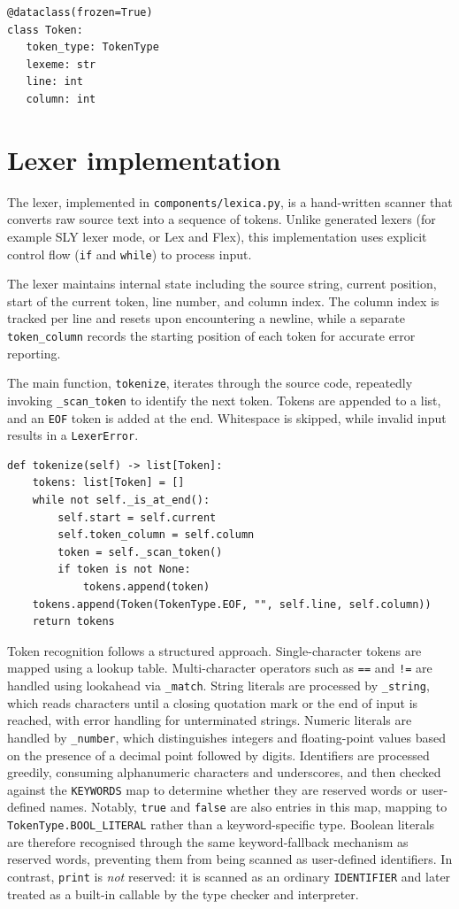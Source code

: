 \begin{lstlisting}
@dataclass(frozen=True)
class Token:
   token_type: TokenType
   lexeme: str
   line: int
   column: int
\end{lstlisting}

\section{Lexer implementation}
The lexer, implemented in \texttt{components/lexica.py}, is a hand-written
scanner that converts raw source text into a sequence of tokens. Unlike
generated lexers (for example SLY lexer mode, or Lex and Flex), this
implementation uses explicit control flow (\texttt{if} and \texttt{while}) to
process input.

The lexer maintains internal state including the source string, current
position, start of the current token, line number, and column index. The
column index is tracked per line and resets upon encountering a newline, while
a separate \texttt{token\_column} records the starting position of each token
for accurate error reporting.

The main function, \texttt{tokenize}, iterates through the source code, repeatedly
invoking \texttt{\_scan\_token} to identify the next token. Tokens are appended
to a list, and an \texttt{EOF} token is added at the end. Whitespace is skipped,
while invalid input results in a \texttt{LexerError}.

\begin{lstlisting}
def tokenize(self) -> list[Token]:
    tokens: list[Token] = []
    while not self._is_at_end():
        self.start = self.current
        self.token_column = self.column
        token = self._scan_token()
        if token is not None:
            tokens.append(token)
    tokens.append(Token(TokenType.EOF, "", self.line, self.column))
    return tokens
\end{lstlisting}

Token recognition follows a structured approach. Single-character tokens are
mapped using a lookup table. Multi-character operators such as \texttt{==} and
\texttt{!=} are handled using lookahead via \texttt{\_match}. String literals
are processed by \texttt{\_string}, which reads characters until a closing
quotation mark or the end of input is reached, with error handling for
unterminated strings. Numeric literals are handled by \texttt{\_number}, which
distinguishes integers and floating-point values based on the presence of a
decimal point followed by digits. Identifiers are processed greedily, consuming
alphanumeric characters and underscores, and then checked against the
\texttt{KEYWORDS} map to determine whether they are reserved words or
user-defined names. Notably, \texttt{true} and \texttt{false} are also entries
in this map, mapping to \texttt{TokenType.BOOL\_LITERAL} rather than a
keyword-specific type. Boolean literals are therefore recognised through the
same keyword-fallback mechanism as reserved words, preventing them from being
scanned as user-defined identifiers. In contrast, \texttt{print} is
\emph{not} reserved: it is scanned as an ordinary \texttt{IDENTIFIER} and later
treated as a built-in callable by the type checker and interpreter.

